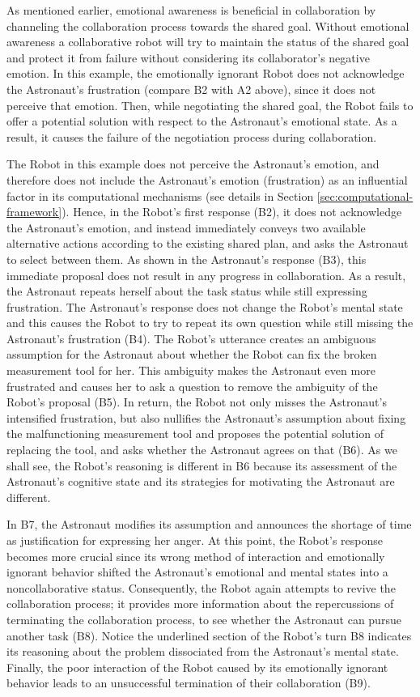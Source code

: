 As mentioned earlier, emotional awareness is beneficial in collaboration by
channeling the collaboration process towards the shared goal. Without emotional
awareness a collaborative robot will try to maintain the status of the shared
goal and protect it from failure without considering its collaborator's negative
emotion. In this example, the emotionally ignorant Robot does not acknowledge
the Astronaut's frustration (compare B2 with A2 above), since it does not
perceive that emotion. Then, while negotiating the shared goal, the Robot fails
to offer a potential solution with respect to the Astronaut's emotional state.
As a result, it causes the failure of the negotiation process during
collaboration.

The Robot in this example does not perceive the Astronaut's emotion, and
therefore does not include the Astronaut's emotion (frustration) as an
influential factor in its computational mechanisms (see details in Section
\ref{sec:computational-framework}). Hence, in the Robot's first response (B2),
it does not acknowledge the Astronaut's emotion, and instead immediately conveys
two available alternative actions according to the existing shared plan, and
asks the Astronaut to select between them. As shown in the Astronaut's response
(B3), this immediate proposal does not result in any progress in collaboration.
As a result, the Astronaut repeats herself about the task status while still
expressing frustration. The Astronaut's response does not change the Robot's
mental state and this causes the Robot to try to repeat its own question while
still missing the Astronaut's frustration (B4). The Robot's utterance creates an
ambiguous assumption for the Astronaut about whether the Robot can fix the
broken measurement tool for her. This ambiguity makes the Astronaut even more
frustrated and causes her to ask a question to remove the ambiguity of the
Robot's proposal (B5). In return, the Robot not only misses the Astronaut's
intensified frustration, but also nullifies the Astronaut's assumption about
fixing the malfunctioning measurement tool and proposes the potential solution
of replacing the tool, and asks whether the Astronaut agrees on that (B6). As we
shall see, the Robot's reasoning is different in B6 because its assessment of
the Astronaut's cognitive state and its strategies for motivating the Astronaut
are different.

In B7, the Astronaut modifies its assumption and announces the shortage of time
as justification for expressing her anger. At this point, the Robot's response
becomes more crucial since its wrong method of interaction and
emotionally ignorant behavior shifted the Astronaut's emotional and mental
states into a noncollaborative status. Consequently, the Robot again attempts to
revive the collaboration process; it provides more information about the
repercussions of terminating the collaboration process, to see whether the
Astronaut can pursue another task (B8). Notice the underlined section of the
Robot's turn B8 indicates its reasoning about the problem dissociated from the
Astronaut's mental state. Finally, the poor interaction of the Robot caused by
its emotionally ignorant behavior leads to an unsuccessful termination of their
collaboration (B9).

